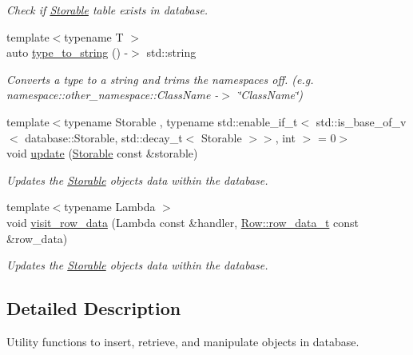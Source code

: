 \begin{DoxyCompactItemize}
\begin{DoxyCompactList}\small\item\em Check if \hyperlink{classdatabase_1_1_storable}{Storable} table exists in database. \end{DoxyCompactList}\item 
{\footnotesize template$<$typename T $>$ }\\auto \hyperlink{namespacedatabase_1_1utils_acb264e8826f50ae828a9c89c2906b049}{type\+\_\+to\+\_\+string} () -\/$>$ std\+::string
\begin{DoxyCompactList}\small\item\em Converts a type to a string and trims the namespaces off. (e.\+g. namespace\+::other\+\_\+namespace\+::\+Class\+Name -\/$>$ \char`\"{}\+Class\+Name\char`\"{}) \end{DoxyCompactList}\item 
{\footnotesize template$<$typename Storable , typename std\+::enable\+\_\+if\+\_\+t$<$ std\+::is\+\_\+base\+\_\+of\+\_\+v$<$ database\+::\+Storable, std\+::decay\+\_\+t$<$ Storable $>$$>$, int $>$  = 0$>$ }\\void \hyperlink{namespacedatabase_1_1utils_ad7fc4b4d352c7b947fc48ac8c1d666a6}{update} (\hyperlink{classdatabase_1_1_storable}{Storable} const \&storable)
\begin{DoxyCompactList}\small\item\em Updates the \hyperlink{classdatabase_1_1_storable}{Storable} objects data within the database. \end{DoxyCompactList}\item 
{\footnotesize template$<$typename Lambda $>$ }\\void \hyperlink{namespacedatabase_1_1utils_a974d01a6dbb387b033f627d846630b92}{visit\+\_\+row\+\_\+data} (Lambda const \&handler, \hyperlink{structdatabase_1_1_row_a29c16186778c974af723db03751f3aa3}{Row\+::row\+\_\+data\+\_\+t} const \&row\+\_\+data)
\begin{DoxyCompactList}\small\item\em Updates the \hyperlink{classdatabase_1_1_storable}{Storable} objects data within the database. \end{DoxyCompactList}\end{DoxyCompactItemize}


\subsection{Detailed Description}
Utility functions to insert, retrieve, and manipulate objects in database. 

